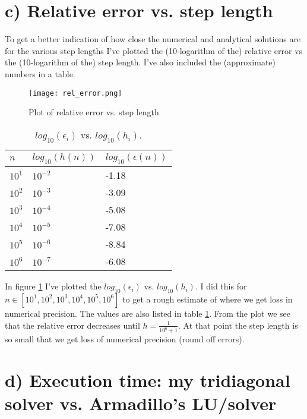 \documentclass[norsk,a4paper,12pt]{article}
\begin{document}
\section{c) Relative error vs. step length}
To get a better indication of how close the numerical and analytical solutions are for the various step lengths I've plotted the (10-logarithm of the) relative error vs the (10-logarithm of the) step length. I've also included the (approximate) numbers in a table.

\begin{figure}[ht!]
    \centering
    \texttt{[image: rel\_error.png]}     
    \caption{Plot of relative error vs. step length}
    \label{fig:rel_error}
\end{figure}


\begin{table}[ht!]
	\caption{$log_{10}(\epsilon_i)$ vs. $log_{10}(h_i)$.}
    \begin{tabular}{|l|l|l|}
    \hline
    $n$     & $log_{10}(h(n))$			  & $log_{10} (\epsilon (n))$ \\ \hline
    $10^1$ & $10^{-2}$                & -1.18                            \\ \hline
    $10^2$ & $10^{-3}$                & -3.09                            \\ \hline
    $10^3$ & $10^{-4}$                & -5.08                            \\ \hline
    $10^4$ & $10^{-5}$                & -7.08                            \\ \hline
    $10^5$ & $10^{-6}$                & -8.84                            \\ \hline
    $10^6$ & $10^{-7}$                & -6.08                            \\ \hline
    \end{tabular}
    \label{tab:rel_error}
\end{table}

In figure \ref{fig:rel_error} I've plotted the $log_{10}(\epsilon_i)$ vs. $log_{10}(h_i)$. I did this for $n \in [10^1, 10^2,10^3,10^4,10^5,10^6]$ to get a rough estimate of where we get loss in numerical precision. The values are also listed in table \ref{tab:rel_error}. From the plot we see that the relative error decreases until $h = \frac{1}{10^6+1}$. At that point the step length is so small that we get loss of numerical precision (round off errors).



\section{d) Execution time: my tridiagonal solver vs. Armadillo's LU/solver}
\end{document}
